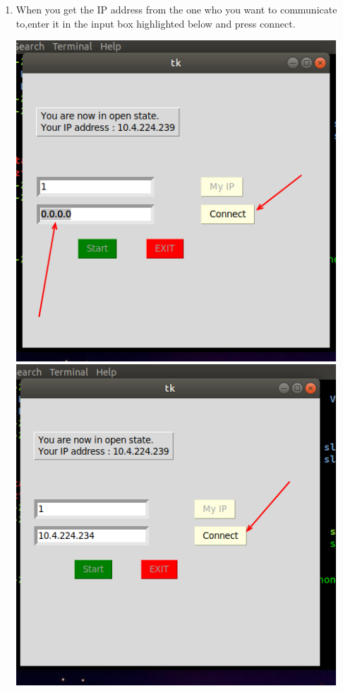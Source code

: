 \documentclass[12pt]{article}
\begin{document}
\begin{enumerate}
    \item When you get the IP address from the one who you want to communicate to,enter it in the input box highlighted below and press connect.
    
    \bigbreak
     \includegraphics[width=120mm,scale=0.8]{4.png}
     \bigbreak
     \includegraphics[width=120mm,scale=0.8]{5.png}
     

\end{enumerate}
\end{document}
